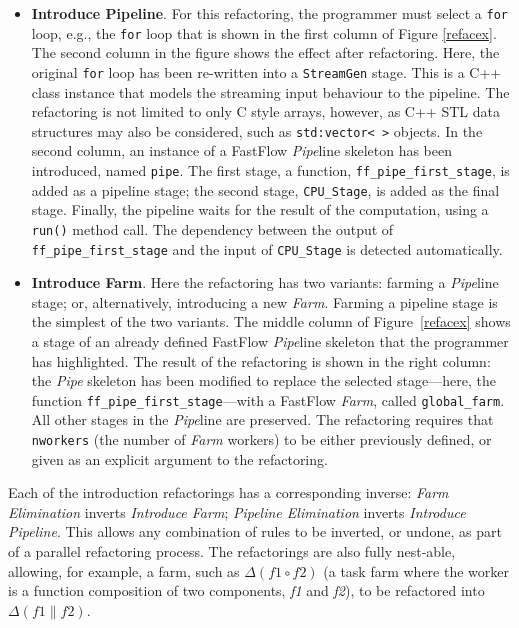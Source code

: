 \documentclass[smallextended]{svjour3}
\begin{document}
\begin{itemize}
\item \textbf{Introduce Pipeline}.
For this refactoring, the programmer must select a \texttt{for} loop, e.g.,
the \texttt{for} loop that is shown in the first column of Figure \ref{refacex}.
The second column in the figure shows the effect after refactoring. %
Here, the original \texttt{for} loop has been re-written into a
\texttt{StreamGen} stage. This is a C++ class instance that models the
streaming input behaviour to the pipeline.  The refactoring is not
limited to only C style arrays, however, as C++ STL data structures may
also be considered, such as \texttt{std:vector< >} objects.  In the
second column, an instance of a FastFlow \emph{Pipe}line skeleton has
been introduced, named \texttt{pipe}.  The first stage, a function,
\texttt{ff\_pipe\_first\_stage}, is added as a pipeline stage; the second
stage, \texttt{CPU\_Stage}, is added as the final stage.  Finally, the
pipeline waits for the result of the computation, using a \texttt{run()}
method call.  The dependency between the output of
\texttt{ff\_pipe\_first\_stage} and the input of \texttt{CPU\_Stage} is
detected automatically. %

\item \textbf{Introduce Farm}.
  Here the refactoring has two variants: farming a \emph{Pipe}line stage;
  or, alternatively, introducing a new \emph{Farm}.  Farming a pipeline
  stage is the simplest of the two variants.  The middle column of
  Figure~\ref{refacex} shows a stage of an already defined FastFlow
  \emph{Pipe}line skeleton that the programmer has highlighted.  The
  result of the refactoring is shown in the right column: the \emph{Pipe}
  skeleton has been modified to replace the selected stage---here, the
  function \texttt{ff\_pipe\_first\_stage}---with a FastFlow \emph{Farm},
  called \texttt{global\_farm}. All other stages in the \emph{Pipe}line
  are preserved. The refactoring requires that \texttt{nworkers} (the
  number of \emph{Farm} workers) to be either previously defined, or given as an
  explicit argument to the refactoring.
\end{itemize}
Each of the introduction refactorings has a corresponding inverse:  \emph{Farm Elimination} inverts \emph{Introduce Farm};
 \emph{Pipeline Elimination} inverts \emph{Introduce Pipeline}. This allows any
combination of rules to be inverted, or undone, as part of a 
parallel refactoring process.  The refactorings are also fully nest-able,
allowing, for example, a farm, such as $\Delta(f1 \circ f2)$ (a task farm
where the worker is a function composition of two components, \emph{f1}
and \emph{f2}), to be refactored into $\Delta(f1 \parallel f2)$.
\end{document}
